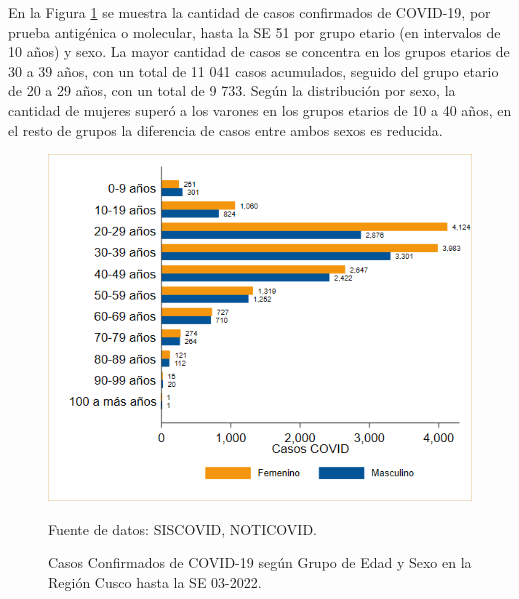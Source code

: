 \documentclass[12pt,a4paper,openany]{book}
\begin{document}
 	\noindent En la Figura \ref{fig:casos_edad_sexo} se muestra la cantidad de casos confirmados de COVID-19, por prueba antigénica o molecular, hasta la SE 51 por grupo etario (en intervalos de 10 años) y sexo. La mayor cantidad de casos se concentra en los grupos etarios de 30 a 39 años, con un total de 11 041 casos acumulados, seguido del grupo etario de 20 a 29 años, con un total de 9 733. Según la distribución por sexo, la cantidad de mujeres superó a los varones en los grupos etarios de 10 a 40 años, en el resto de grupos la diferencia de casos entre ambos sexos es reducida.  
 	
 	
\begin{figure}[h]
	\caption{Casos Confirmados de COVID-19 según Grupo de Edad y Sexo en la Región Cusco hasta la SE 03-2022.}\label{fig:casos_edad_sexo}
	\begin{center}
		\includegraphics[width=0.75\linewidth]{../figuras/casos_etapavida_2022}
	\end{center}
	{\footnotesize {Fuente de datos: SISCOVID, NOTICOVID.}}
\end{figure}
\pagebreak
\end{document}
